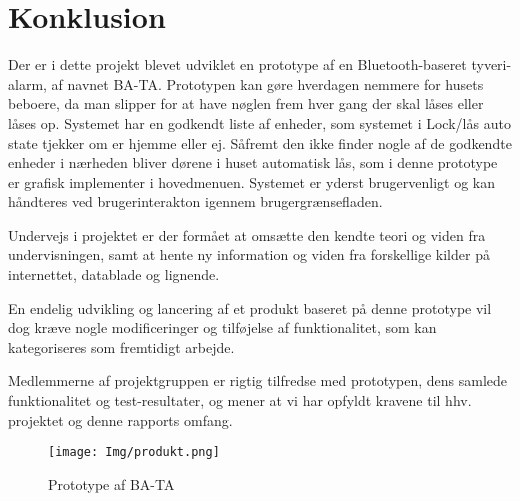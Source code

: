 \graphicspath{{Chapters/Konklusion/}}


\section{Konklusion}

Der er i dette projekt blevet udviklet en prototype af en Bluetooth-baseret tyveri-alarm, af navnet BA-TA.
Prototypen kan gøre hverdagen nemmere for husets beboere, da man slipper for at have nøglen frem hver gang der skal låses eller låses op. Systemet har en godkendt liste af enheder, som systemet i Lock/lås auto state tjekker om er hjemme eller ej. Såfremt den ikke finder nogle af de godkendte enheder i nærheden bliver dørene i huset automatisk lås, som i denne prototype er grafisk implementer i hovedmenuen. Systemet er yderst brugervenligt og kan håndteres ved brugerinterakton igennem brugergrænsefladen.

Undervejs i projektet er der formået at omsætte den kendte teori og viden fra undervisningen, samt at hente ny information og viden fra forskellige kilder på internettet, datablade og lignende. 

En endelig udvikling og lancering af et produkt baseret på denne prototype vil dog kræve nogle modificeringer og tilføjelse af funktionalitet, som kan kategoriseres som fremtidigt arbejde.

Medlemmerne af projektgruppen er rigtig tilfredse med prototypen, dens samlede funktionalitet og test-resultater, og mener at vi har opfyldt kravene til hhv. projektet og denne rapports omfang.

\begin{figure}[H]
	\centering
	\texttt{[image: Img/produkt.png]}
	\caption{Prototype af BA-TA}
	\label{fig:prototypeBATA}
\end{figure}